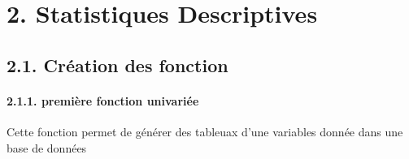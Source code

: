 \documentclass[
]{article}
\begin{document}
\hypertarget{statistiques-descriptives}{%
\section{2. Statistiques Descriptives}\label{statistiques-descriptives}}

\hypertarget{cruxe9ation-des-fonction}{%
\subsection{2.1. Création des fonction}\label{cruxe9ation-des-fonction}}

\hypertarget{premiuxe8re-fonction-univariuxe9e}{%
\paragraph{2.1.1. première fonction
univariée}\label{premiuxe8re-fonction-univariuxe9e}}

Cette fonction permet de générer des tableuax d'une variables donnée
dans une base de données
\end{document}
